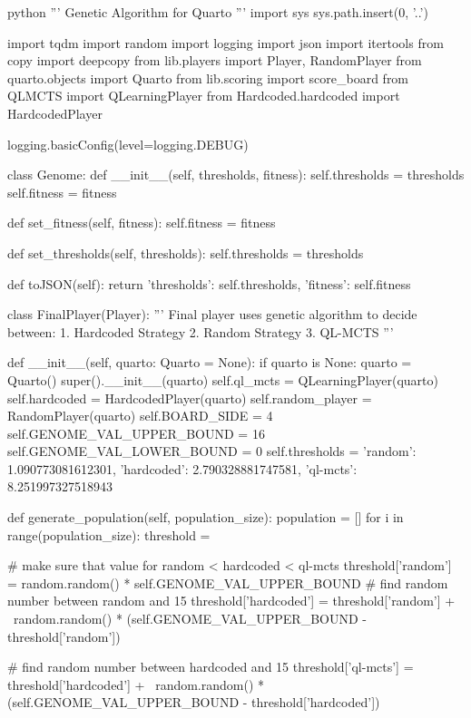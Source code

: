 \begin{mintedbox}{python}
'''
Genetic Algorithm for Quarto
'''
import sys
sys.path.insert(0, '..')

import tqdm
import random
import logging
import json
import itertools
from copy import deepcopy
from lib.players import Player, RandomPlayer
from quarto.objects import Quarto
from lib.scoring import score_board
from QLMCTS import QLearningPlayer
from Hardcoded.hardcoded import HardcodedPlayer

logging.basicConfig(level=logging.DEBUG)

class Genome:
    def __init__(self, thresholds, fitness):
        self.thresholds = thresholds
        self.fitness = fitness

    def set_fitness(self, fitness):
        self.fitness = fitness

    def set_thresholds(self, thresholds):
        self.thresholds = thresholds

    def toJSON(self):
        return {
            'thresholds': self.thresholds,
            'fitness': self.fitness
        }


class FinalPlayer(Player):
    '''
    Final player uses genetic algorithm to decide between:
    1. Hardcoded Strategy
    2. Random Strategy
    3. QL-MCTS
    '''

    def __init__(self, quarto: Quarto = None):
        if quarto is None:
            quarto = Quarto()
        super().__init__(quarto)
        self.ql_mcts = QLearningPlayer(quarto)
        self.hardcoded = HardcodedPlayer(quarto)
        self.random_player = RandomPlayer(quarto)
        self.BOARD_SIDE = 4
        self.GENOME_VAL_UPPER_BOUND = 16
        self.GENOME_VAL_LOWER_BOUND = 0
        self.thresholds = {
            'random': 1.090773081612301,
            'hardcoded': 2.790328881747581,
            'ql-mcts': 8.251997327518943
        }

    def generate_population(self, population_size):
        population = []
        for i in range(population_size):
            threshold = {}

            # make sure that value for random < hardcoded < ql-mcts
            threshold['random'] = random.random() * self.GENOME_VAL_UPPER_BOUND
            # find random number between random and 15
            threshold['hardcoded'] = threshold['random'] + \
                random.random() * (self.GENOME_VAL_UPPER_BOUND -
                                    threshold['random'])

            # find random number between hardcoded and 15
            threshold['ql-mcts'] = threshold['hardcoded'] + \
                random.random() * (self.GENOME_VAL_UPPER_BOUND -
                                    threshold['hardcoded'])


\end{mintedbox}
